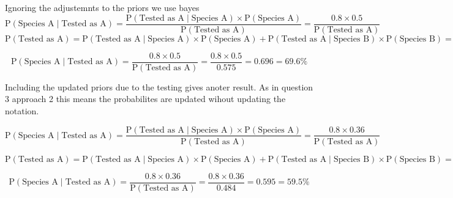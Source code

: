 \documentclass[]{article}
\begin{document}
Ignoring the adjustemnts to the priors we use bayes
\[\textrm{P}(\textrm{Species A} \mid  \textrm{Tested as A})  = \frac{\textrm{P}(  \textrm{Tested as A}\mid  \textrm{Species A} ) \times \textrm{P}(\textrm{Species A})}{ \textrm{P}(\textrm{Tested as A}) } = \frac{0.8 \times 0.5}{\textrm{P}(\textrm{Tested as A})}\]
\[\textrm{P}(\textrm{Tested as A}) =  \textrm{P}(\textrm{Tested as A} \mid \textrm{Species A}) \times \textrm{P}(\textrm{Species A}) +  \textrm{P}(\textrm{Tested as A} \mid \textrm{Species B}) \times \textrm{P}(\textrm{Species B}) = 0.8 \times 0.5 + 0.35 \times 0.5 = 0.575\]

\[\textrm{P}(\textrm{Species A} \mid  \textrm{Tested as A})  = \frac{0.8 \times 0.5}{\textrm{P}(\textrm{Tested as A})} = \frac{0.8 \times 0.5}{ 0.575 } = 0.696 = 69.6\%\]

Including the updated priors due to the testing gives anoter result. As
in question 3 approach 2 this means the probabilites are updated wihout
updating the notation.

\[\textrm{P}(\textrm{Species A} \mid  \textrm{Tested as A})  = \frac{\textrm{P}(  \textrm{Tested as A}\mid  \textrm{Species A} ) \times \textrm{P}(\textrm{Species A})}{ \textrm{P}(\textrm{Tested as A}) } = \frac{0.8 \times 0.36}{\textrm{P}(\textrm{Tested as A})}\]

\[\textrm{P}(\textrm{Tested as A}) =  \textrm{P}(\textrm{Tested as A} \mid \textrm{Species A}) \times \textrm{P}(\textrm{Species A}) +  \textrm{P}(\textrm{Tested as A} \mid \textrm{Species B}) \times \textrm{P}(\textrm{Species B}) = 0.8 \times 0.36 + 0.35 \times 0.56 = 0.484\]

\[\textrm{P}(\textrm{Species A} \mid  \textrm{Tested as A})  = \frac{0.8 \times 0.36}{\textrm{P}(\textrm{Tested as A})} = \frac{0.8 \times 0.36}{  0.484}  =  0.595 = 59.5\% \]
\end{document}
